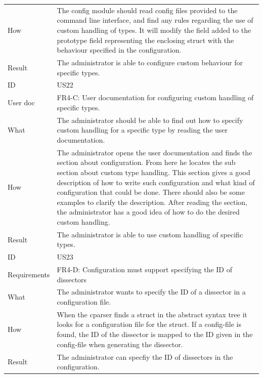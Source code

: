 \begin{table}[htbp]
{\begin{tabularx}{1.2\textwidth}{l X}
	How & The config module should read config files provided to the command line interface, and find any rules regarding the use of custom handling of types.
 	It will modify the field added to the prototype field representing the enclosing struct with the behaviour specified in the configuration. \\
	Result & The administrator is able to configure custom behaviour for specific types. \\
	\midrule
	ID & US22 \\
	User doc & FR4-C: User documentation for configuring custom handling of specific types. \\
	What & The administrator should be able to find out how to specify custom handling for a specific type by reading the user documentation.\\
	How & The administrator opens the user documentation and finds the section about configuration. From here he locates the sub section about custom type handling. 
	This section gives a good description of how to write such configuration and what kind of configuration that could be done. There should also be some
 	examples to clarify the description. After reading the section, the administrator has a good idea of how to do the desired custom handling. \\
	Result & The administrator is able to use custom handling of specific types. \\
	\midrule
	ID & US23 \\
	Requirements &  FR4-D: Configuration must support specifying the ID of dissectors \\
	What & The administrator wants to specify the ID of a dissector in a configuration file. \\
	How & When the cparser finds a struct in the abstract syntax tree it looks for a configuration file for the struct. If a config-file is found, the ID of the dissector
	is mapped to the ID given in the config-file when generating the dissector. \\	
	Result & The administrator can specfiy the ID of dissectors in the configuration. \\
	\midrule
	
\end{tabularx}}
\end{table}


